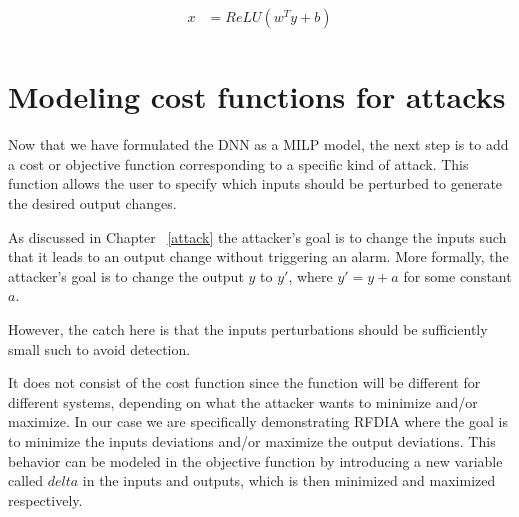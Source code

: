 \begin{equation}
\label{10}
\begin{aligned}
x &= ReLU(w^Ty + b) \\
\end{aligned}
\end{equation}

\section{Modeling cost functions for attacks}
\label{section:costfunction}
Now that we have formulated the DNN as a MILP model, the next step is to add a cost or objective function corresponding to a specific kind of attack. 
This function allows the user to specify which inputs should be perturbed to generate the desired output changes.

As discussed in Chapter ~\ref{attack} the attacker's goal is to change the inputs such that it leads to an output change without triggering an alarm.
More formally, the attacker's goal is to change the output $y$ to $y'$, where $y' = y + a$ for some constant $a$. 

 



However, the catch here is that the inputs perturbations should be sufficiently small such to avoid detection.  


It does not consist of the cost function since the function will be different for different systems, depending on what the attacker wants to minimize and/or maximize.
In our case we are specifically demonstrating \ac{RFDIA} where the goal is to minimize the inputs deviations and/or maximize the output deviations.  
This behavior can be modeled in the objective function by introducing a new variable called $delta$ in the inputs and outputs, which is then minimized and maximized  respectively. 

